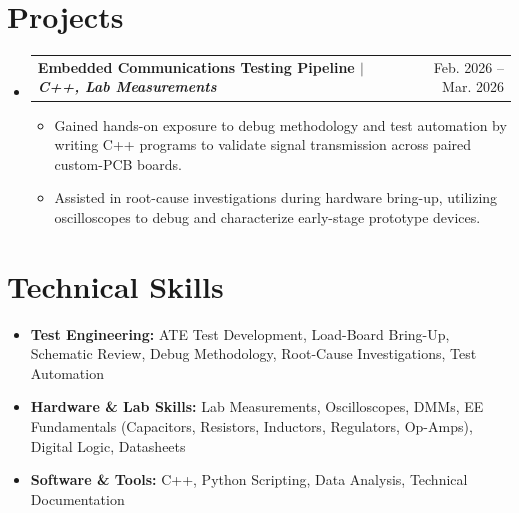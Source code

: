 \documentclass[letterpaper,11pt]{article}
\makeatletter
\newcommand{\resumeItem}[1]{\item{#1}}
\newcommand{\resumeProjectHeading}[2]{
  \item
    \begin{tabular*}{0.97\textwidth}[t]{l@{\extracolsep{\fill}}r}
      \textbf{#1} & #2 \\
    \end{tabular*}
}
\newcommand{\resumeSubHeadingListStart}{\begin{itemize}[label=\textbullet]}
\newcommand{\resumeSubHeadingListEnd}{\end{itemize}}
\newcommand{\resumeItemListStart}{\begin{itemize}[label=-]}
\newcommand{\resumeItemListEnd}{\end{itemize}}
\makeatother
\begin{document}
\section{Projects}
\resumeSubHeadingListStart
  \resumeProjectHeading{Embedded Communications Testing Pipeline $\vert$ \emph{C++, Lab Measurements}}{Feb. 2026 -- Mar. 2026}
  \resumeItemListStart
    \resumeItem{Gained hands-on exposure to debug methodology and test automation by writing C++ programs to validate signal transmission across paired custom-PCB boards.}
    \resumeItem{Assisted in root-cause investigations during hardware bring-up, utilizing oscilloscopes to debug and characterize early-stage prototype devices.}
  \resumeItemListEnd
\resumeSubHeadingListEnd

\section{Technical Skills}
\resumeSubHeadingListStart
  \item{\textbf{Test Engineering:} ATE Test Development, Load-Board Bring-Up, Schematic Review, Debug Methodology, Root-Cause Investigations, Test Automation}
  \item{\textbf{Hardware \& Lab Skills:} Lab Measurements, Oscilloscopes, DMMs, EE Fundamentals (Capacitors, Resistors, Inductors, Regulators, Op-Amps), Digital Logic, Datasheets}
  \item{\textbf{Software \& Tools:} C++, Python Scripting, Data Analysis, Technical Documentation}
\resumeSubHeadingListEnd
\end{document}
